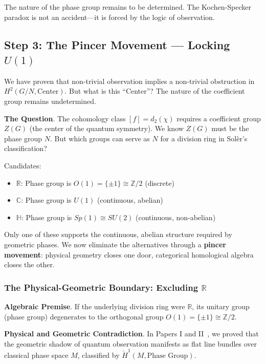 \documentclass[11pt]{article}
\begin{document}
The nature of the phase group remains to be determined. The Kochen-Specker paradox is not an accident---it is forced by the logic of observation.

\subsection{Step 3: The Pincer Movement --- Locking $U(1)$}
\label{step-3-pincer-movement}

We have proven that non-trivial observation implies a non-trivial obstruction in $H^2(G/N, \text{Center})$. But what is this ``Center''? The nature of the coefficient group remains undetermined.

\textbf{The Question}.
The cohomology class $[f] = d_2(\chi)$ requires a coefficient group $Z(G)$ (the center of the quantum symmetry). We know $Z(G)$ must be the phase group $N$. But which groups can serve as $N$ for a division ring in Sol\`{e}r's classification?

Candidates:
\begin{itemize}
\item \textbf{$\mathbb{R}$}: Phase group is $O(1) = \{\pm 1\} \cong \mathbb{Z}/2$ (discrete)
\item \textbf{$\mathbb{C}$}: Phase group is $U(1)$ (continuous, abelian)
\item \textbf{$\mathbb{H}$}: Phase group is $Sp(1) \cong SU(2)$ (continuous, non-abelian)
\end{itemize}

Only one of these supports the continuous, abelian structure required by geometric phases. We now eliminate the alternatives through a \textbf{pincer movement}: physical geometry closes one door, categorical homological algebra closes the other.

\subsubsection{The Physical-Geometric Boundary: Excluding $\mathbb{R}$}
\label{excluding-r}

\textbf{Algebraic Premise}.
If the underlying division ring were $\mathbb{R}$, its unitary group (phase group) degenerates to the orthogonal group $O(1) = \{\pm 1\} \cong \mathbb{Z}/2$.

\textbf{Physical and Geometric Contradiction}.
In Papers I and II~\cite{PaperI,PaperII}, we proved that the geometric shadow of quantum observation manifests as flat line bundles over classical phase space $M$, classified by $\check{H}^1(M, \text{Phase Group})$.
\end{document}
